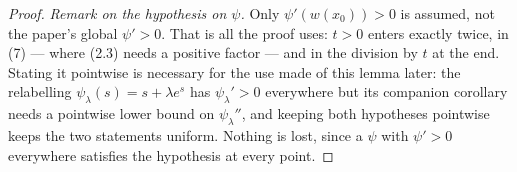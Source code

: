 \begin{proof}
\medskip\noindent\emph{Remark on the hypothesis on $\psi$.} Only $\psi'(w(x_0))>0$ is
assumed, not the paper's global $\psi'>0$. That is all the proof uses: $t>0$ enters
exactly twice, in (7) --- where (2.3) needs a positive factor --- and in the division
by $t$ at the end. Stating it pointwise is necessary for the use made of this lemma later:
the relabelling $\psi_\lambda(s)=s+\lambda e^{s}$ has $\psi_\lambda'>0$ everywhere but its
companion corollary needs a pointwise lower bound on $\psi_\lambda''$, and keeping both
hypotheses pointwise keeps the two statements uniform. Nothing is lost, since a $\psi$
with $\psi'>0$ everywhere satisfies the hypothesis at every point.
\end{proof}
